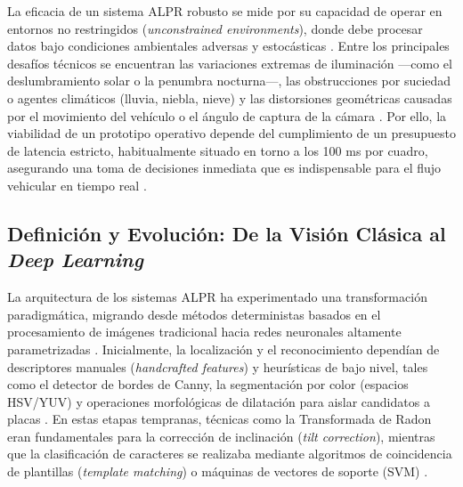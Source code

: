 La eficacia de un sistema ALPR robusto se mide por su capacidad de operar en entornos 
no restringidos (\textit{unconstrained environments}), donde debe procesar datos bajo 
condiciones ambientales adversas y estocásticas 
\parencite{PDFRealTimeLicense2026, xuDeepLearningAlgorithms2026c, 
vargooraniLicensePlateDetection2024}. 
Entre los principales desafíos técnicos se encuentran las variaciones extremas de 
iluminación ---como el deslumbramiento solar o la penumbra nocturna---, las 
obstrucciones por suciedad o agentes climáticos (lluvia, niebla, nieve) y las 
distorsiones geométricas causadas por el movimiento del vehículo o el ángulo de 
captura de la cámara 
\parencite{buleuDeepLearningBasedSystem2025a, mobeenRealTimeAutomaticLicense2026, 
sonnaraEfficientRealtimeLicense2025, xiongLicensePlateRecognition2026}. 
Por ello, la viabilidad de un prototipo operativo depende del cumplimiento de un 
presupuesto de latencia estricto, habitualmente situado en torno a los 100 ms por 
cuadro, asegurando una toma de decisiones inmediata que es indispensable para el 
flujo vehicular en tiempo real 
\parencite{kuyunsaDeepLearningEnhancedAutomatic2025, 
sonnaraEfficientRealtimeLicense2025}.


\subsection{Definición y Evolución: De la Visión Clásica al \textit{Deep Learning}}

La arquitectura de los sistemas ALPR ha experimentado una transformación paradigmática, 
migrando desde métodos deterministas basados en el procesamiento de imágenes tradicional 
hacia redes neuronales altamente parametrizadas 
\parencite{mobeenRealTimeAutomaticLicense2026, xuDeepLearningAlgorithms2026c}. 
Inicialmente, la localización y el reconocimiento dependían de descriptores manuales 
(\textit{handcrafted features}) y heurísticas de bajo nivel, tales como el detector de 
bordes de Canny, la segmentación por color (espacios HSV/YUV) y operaciones morfológicas 
de dilatación para aislar candidatos a placas 
\parencite{PDFRealTimeLicense2026, mobeenRealTimeAutomaticLicense2026, 
xuDeepLearningAlgorithms2026c}. 
En estas etapas tempranas, técnicas como la Transformada de Radon eran fundamentales 
para la corrección de inclinación (\textit{tilt correction}), mientras que la 
clasificación de caracteres se realizaba mediante algoritmos de coincidencia de 
plantillas (\textit{template matching}) o máquinas de vectores de soporte (SVM) 
\parencite{buleuDeepLearningBasedSystem2025a, sonnaraEfficientRealtimeLicense2025}.

